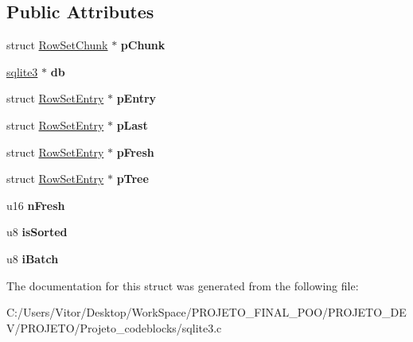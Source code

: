 \subsection*{Public Attributes}
\begin{DoxyCompactItemize}
\item 
\hypertarget{struct_row_set_af064f9ec7b1ba820a3d53622bde9d42f}{struct \hyperlink{struct_row_set_chunk}{Row\-Set\-Chunk} $\ast$ {\bfseries p\-Chunk}}\label{struct_row_set_af064f9ec7b1ba820a3d53622bde9d42f}

\item 
\hypertarget{struct_row_set_a7da847a06c2f90025fbd89c57516c6f6}{\hyperlink{structsqlite3}{sqlite3} $\ast$ {\bfseries db}}\label{struct_row_set_a7da847a06c2f90025fbd89c57516c6f6}

\item 
\hypertarget{struct_row_set_a3eccaf69ad7863abae2541a7c0b94e1d}{struct \hyperlink{struct_row_set_entry}{Row\-Set\-Entry} $\ast$ {\bfseries p\-Entry}}\label{struct_row_set_a3eccaf69ad7863abae2541a7c0b94e1d}

\item 
\hypertarget{struct_row_set_a040c4b798e6f20d20aa99a45e93b2079}{struct \hyperlink{struct_row_set_entry}{Row\-Set\-Entry} $\ast$ {\bfseries p\-Last}}\label{struct_row_set_a040c4b798e6f20d20aa99a45e93b2079}

\item 
\hypertarget{struct_row_set_a7c4e95bd08ff77135068bb3987be5ca1}{struct \hyperlink{struct_row_set_entry}{Row\-Set\-Entry} $\ast$ {\bfseries p\-Fresh}}\label{struct_row_set_a7c4e95bd08ff77135068bb3987be5ca1}

\item 
\hypertarget{struct_row_set_a10dee0e9d9998a3726bcd4f20754991b}{struct \hyperlink{struct_row_set_entry}{Row\-Set\-Entry} $\ast$ {\bfseries p\-Tree}}\label{struct_row_set_a10dee0e9d9998a3726bcd4f20754991b}

\item 
\hypertarget{struct_row_set_a0ed2a47d6789a70081f3454ef2604e7f}{u16 {\bfseries n\-Fresh}}\label{struct_row_set_a0ed2a47d6789a70081f3454ef2604e7f}

\item 
\hypertarget{struct_row_set_a59ef5b2dc2d3d8317307254743f92545}{u8 {\bfseries is\-Sorted}}\label{struct_row_set_a59ef5b2dc2d3d8317307254743f92545}

\item 
\hypertarget{struct_row_set_af33d206290792936cb1ebbb8e03baf64}{u8 {\bfseries i\-Batch}}\label{struct_row_set_af33d206290792936cb1ebbb8e03baf64}

\end{DoxyCompactItemize}


The documentation for this struct was generated from the following file\-:\begin{DoxyCompactItemize}
\item 
C\-:/\-Users/\-Vitor/\-Desktop/\-Work\-Space/\-P\-R\-O\-J\-E\-T\-O\-\_\-\-F\-I\-N\-A\-L\-\_\-\-P\-O\-O/\-P\-R\-O\-J\-E\-T\-O\-\_\-\-D\-E\-V/\-P\-R\-O\-J\-E\-T\-O/\-Projeto\-\_\-codeblocks/sqlite3.\-c\end{DoxyCompactItemize}
